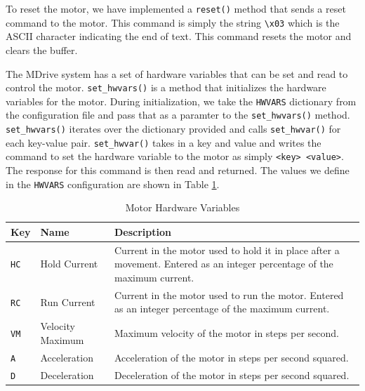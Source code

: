 To reset the motor, we have implemented a \texttt{reset()} method that sends a reset command to the motor.
This command is simply the string \texttt{\textbackslash x03} which is the ASCII character indicating the end of text.
This command resets the motor and clears the buffer.

The MDrive system has a set of hardware variables that can be set and read to control the motor.
\texttt{set\_hwvars()} is a method that initializes the hardware variables for the motor.
During initialization, we take the \texttt{HWVARS} dictionary from the configuration file and pass that as a paramter to the \texttt{set\_hwvars()} method.
\texttt{set\_hwvars()} iterates over the dictionary provided and calls \texttt{set\_hwvar()} for each key-value pair.
\texttt{set\_hwvar()} takes in a key and value and writes the command to set the hardware variable to the motor as simply \texttt{<key> <value>}.
The response for this command is then read and returned.
The values we define in the \texttt{HWVARS} configuration are shown in Table \ref{readout/table:motor_hwvars}.

\begin{table}
    \centering
    \begin{tabularx}{\textwidth}{l|l|X}
        \textbf{Key} & \textbf{Name} & \textbf{Description} \\ \hline    
        \texttt{HC} & Hold Current & Current in the motor used to hold it in place after a movement. Entered as an integer percentage of the maximum current.\\
        \texttt{RC} & Run Current & Current in the motor used to run the motor. Entered as an integer percentage of the maximum current.\\
        \texttt{VM} & Velocity Maximum & Maximum velocity of the motor in steps per second.\\
        \texttt{A} & Acceleration & Acceleration of the motor in steps per second squared.\\
        \texttt{D} & Deceleration & Deceleration of the motor in steps per second squared.
    \end{tabularx}
    \caption{Motor Hardware Variables}
    \label{readout/table:motor_hwvars}
\end{table}

